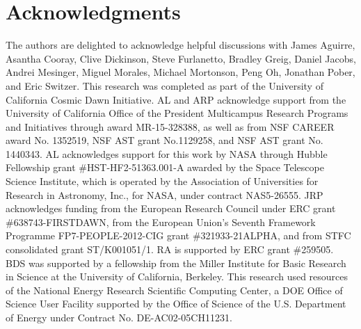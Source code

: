 \documentclass[twocolumn,aps,prd,nofootinbib,showpacs,superscriptaddress]{revtex4-1}
\begin{document}
\section*{Acknowledgments}
The authors are delighted to acknowledge helpful discussions with James Aguirre, Asantha Cooray, Clive Dickinson, Steve Furlanetto, Bradley Greig, Daniel Jacobs, Andrei Mesinger, Miguel Morales, Michael Mortonson, Peng Oh, Jonathan Pober, and Eric Switzer. This research was completed as part of the University of California Cosmic Dawn Initiative. AL and ARP acknowledge support from the University of California Office of the President Multicampus Research Programs and Initiatives through award MR-15-328388, as well as from NSF CAREER award No. 1352519, NSF AST grant No.1129258, and NSF AST grant No. 1440343. AL acknowledges support for this work by NASA through Hubble Fellowship grant \#HST-HF2-51363.001-A awarded by the Space Telescope Science Institute, which is operated by the Association of Universities for Research in Astronomy, Inc., for NASA, under contract NAS5-26555. JRP acknowledges funding from the European Research Council under ERC grant \#638743-FIRSTDAWN, from the European Union's Seventh Framework Programme FP7-PEOPLE-2012-CIG grant \#321933-21ALPHA, and from STFC consolidated grant ST/K001051/1. RA is supported by ERC grant \#259505. BDS was supported by a
fellowship from the Miller Institute for Basic Research in Science at the University of California, Berkeley. This research used resources of the National Energy Research Scientific Computing Center, a DOE Office of Science User Facility supported by the Office of Science of the U.S. Department of Energy under Contract No. DE-AC02-05CH11231. 




\end{document}
